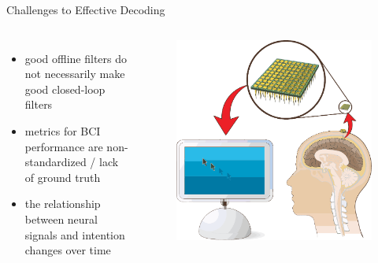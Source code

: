 \documentclass[aspectratio=169,19pt,xetex,handout]{beamer}
\begin{document}
\begin{frame}{Challenges to Effective Decoding}
\Large
\begin{columns}
\begin{itemize}
    \item good offline filters do not necessarily make good closed-loop filters~\cite{Jar13}
    \item metrics for BCI performance are non-standardized / lack of ground truth~\cite{Bil13,Tho14}
    \item the relationship between neural signals and intention changes over time~\cite{Per13,Per14}
\end{itemize}
\begin{figure}
\includegraphics[width=\textwidth]{bg_diagram}
\end{figure}
\end{columns}

\end{frame}
\end{document}
